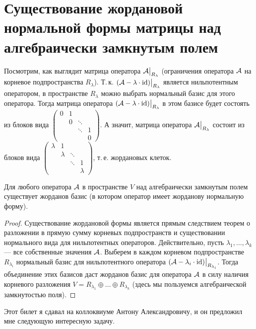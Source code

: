 \section{Существование жордановой нормальной формы матрицы над алгебраически замкнутым полем}

Посмотрим, как выглядит матрица оператора $\mathcal{A}\big|_{R_\lambda}$ (ограничения оператора $\mathcal{A}$ на корневое подпространства $R_\lambda$). Т.\,к. $(\mathcal{A} - \lambda \cdot \mathrm{id})\big|_{R_\lambda}$ является нильпотентным оператором, в пространстве $R_\lambda$ можно выбрать нормальный базис для этого оператора. Тогда матрица оператора $(\mathcal{A} - \lambda \cdot \mathrm{id})\big|_{R_\lambda}$ в этом базисе будет состоять из блоков вида
$
\begin{pmatrix}
    0 & 1 &  &  \\
      & 0 & \ddots & \\
      & & \ddots & 1\\
      & & & 0
\end{pmatrix}
$. А значит, матрица оператора $\mathcal{A}\big|_{R_\lambda}$ состоит из блоков вида
$
\begin{pmatrix}
    \lambda & 1 &  &  \\
      & \lambda & \ddots & \\
      & & \ddots & 1\\
      & & & \lambda
\end{pmatrix}
$, т.\,е. жордановых клеток.

\begin{theorem}
    Для любого оператора $\mathcal{A}$ в пространстве $V$ над алгебраически замкнутым полем существует жорданов базис (в котором оператор имеет жорданову нормальную форму).
\end{theorem}

\begin{proof}
    Существование жордановой формы является прямым следствием теорем о разложении в прямую сумму корневых подпространств и существовании нормального вида для нильпотентных операторов. Действительно, пусть $\lambda_1, \ldots, \lambda_k$ --- все собственные значения $\mathcal{A}$. Выберем в каждом корневом подпространстве $R_{\lambda_i}$ нормальный базис для нильпотентного оператора $(\mathcal{A} - \lambda_i \cdot \mathrm{id})\big|_{R_{\lambda_i}}$. Тогда объединение этих базисов даст жорданов базис для оператора $\mathcal{A}$ в силу наличия корневого разложения $V = R_{\lambda_1} \oplus \ldots \oplus R_{\lambda_k}$ (здесь мы пользуемся алгебраической замкнутостью поля).
\end{proof}

Этот билет я сдавал на коллоквиуме Антону Александровичу, и он предложил мне следующую интересную задачу.

